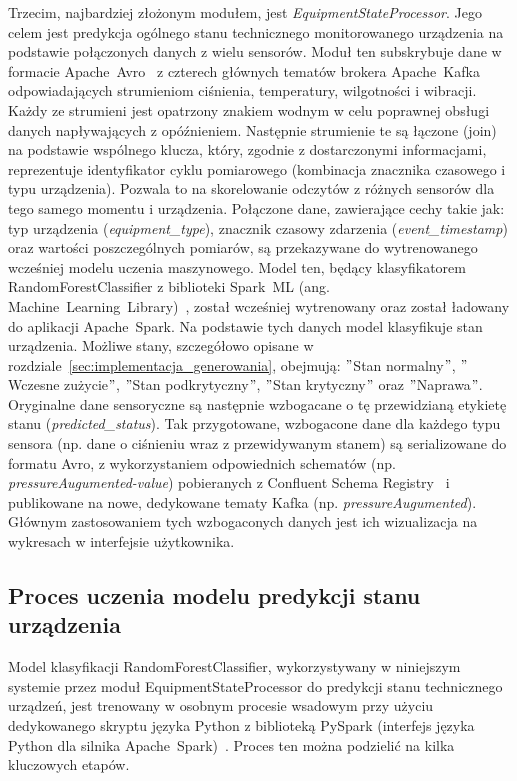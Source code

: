 Trzecim, najbardziej złożonym modułem, jest \textit{EquipmentStateProcessor}. Jego celem jest predykcja ogólnego stanu technicznego monitorowanego urządzenia na podstawie połączonych danych z wielu sensorów. Moduł ten subskrybuje dane w formacie \mbox{Apache Avro}~\cite{avro_documentation} z czterech głównych tematów brokera \mbox{Apache Kafka} odpowiadających strumieniom ciśnienia, temperatury, wilgotności i wibracji. Każdy ze strumieni jest opatrzony znakiem wodnym w celu poprawnej obsługi danych napływających z opóźnieniem. Następnie strumienie te są łączone (join) na podstawie wspólnego klucza, który, zgodnie z dostarczonymi informacjami, reprezentuje identyfikator cyklu pomiarowego (kombinacja znacznika czasowego i typu urządzenia). Pozwala to na skorelowanie odczytów z różnych sensorów dla tego samego momentu i urządzenia. Połączone dane, zawierające cechy takie jak: typ urządzenia (\textit{equipment\_type}), znacznik czasowy zdarzenia (\textit{event\_timestamp}) oraz wartości poszczególnych pomiarów, są przekazywane do wytrenowanego wcześniej modelu uczenia maszynowego. Model ten, będący klasyfikatorem RandomForestClassifier z biblioteki \mbox{Spark ML} (ang. \mbox{Machine Learning Library})~\cite{spark_mllib_reference}, został wcześniej wytrenowany oraz został ładowany do aplikacji \mbox{Apache Spark}. Na podstawie tych danych model klasyfikuje stan urządzenia. Możliwe stany, szczegółowo opisane w rozdziale~\ref{sec:implementacja_generowania}, obejmują: \("\)Stan normalny\("\), \("\)Wczesne zużycie\("\), \("\)Stan podkrytyczny\("\), \("\)Stan krytyczny\("\) oraz \("\)Naprawa\("\). Oryginalne dane sensoryczne są następnie wzbogacane o tę przewidzianą etykietę stanu (\textit{predicted\_status}). Tak przygotowane, wzbogacone dane dla każdego typu sensora (np. dane o ciśnieniu wraz z przewidywanym stanem) są serializowane do formatu Avro, z wykorzystaniem odpowiednich schematów (np. \textit{pressureAugumented-value}) pobieranych z Confluent Schema Registry~\cite{confluent_schema_registry} i publikowane na nowe, dedykowane tematy Kafka (np. \textit{pressureAugumented}). Głównym zastosowaniem tych wzbogaconych danych jest ich wizualizacja na wykresach w interfejsie użytkownika.

\subsection{Proces uczenia modelu predykcji stanu urządzenia}
\label{subsec:uczenie_modelu_stanu}

Model klasyfikacji RandomForestClassifier, wykorzystywany w niniejszym systemie przez moduł EquipmentStateProcessor do predykcji stanu technicznego urządzeń, jest trenowany w osobnym procesie wsadowym przy użyciu dedykowanego skryptu języka Python z biblioteką \mbox{PySpark} (interfejs języka Python dla silnika \mbox{Apache Spark})~\cite{pyspark_docs}. Proces ten można podzielić na kilka kluczowych etapów.

